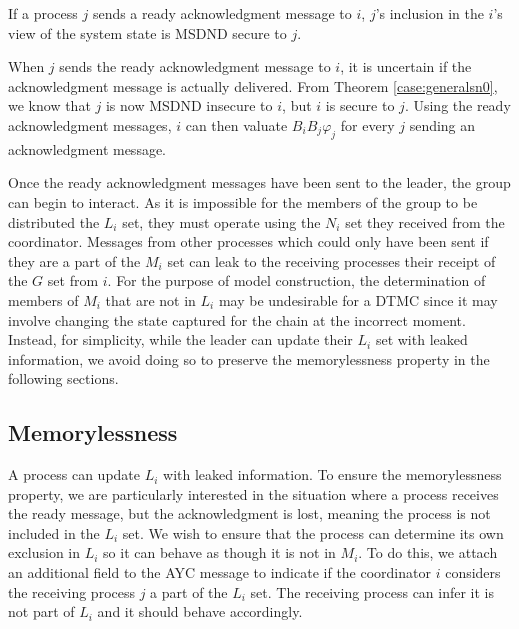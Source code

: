 \begin{thm}
    If a process $j$ sends a ready acknowledgment message to $i$, $j$'s inclusion in the $i$'s view of the system state is MSDND secure to $j$.
\end{thm}
\begin{prooftight}
When $j$ sends the ready acknowledgment message to $i$, it is uncertain if the acknowledgment message is actually delivered.
From Theorem \ref{case:generalsn0}, we know that $j$ is now MSDND insecure to $i$, but $i$ is secure to $j$.
Using the ready acknowledgment messages, $i$ can then valuate $B_i B_j \varphi_j$ for every $j$ sending an acknowledgment message.
\end{prooftight}

Once the ready acknowledgment messages have been sent to the leader, the group can begin to interact.
As it is impossible for the members of the group to be distributed the $L_i$ set, they must operate using the $N_i$ set they received from the coordinator.
Messages from other processes which could only have been sent if they are a part of the $M_i$ set can leak to the receiving processes their receipt of the $G$ set from $i$.
For the purpose of model construction, the determination of members of $M_i$ that are not in $L_i$ may be undesirable for a \ac{DTMC} since it may involve changing the state captured for the chain at the incorrect moment.
Instead, for simplicity, while the leader can update their $L_i$ set with leaked information, we avoid doing so to preserve the memorylessness property in the following sections.



\subsection{Memorylessness}

A process can update $L_i$ with leaked information.
To ensure the memorylessness property, we are particularly interested in the situation where a process receives the ready message, but the acknowledgment is lost, meaning the process is not included in the $L_i$ set.
We wish to ensure that the process can determine its own exclusion in $L_i$ so it can behave as though it is not in $M_i$.
To do this, we attach an additional field to the \ac{AYC} message to indicate if the coordinator $i$ considers the receiving process $j$ a part of the $L_i$ set.
The receiving process can infer it is not part of $L_i$ and it should behave accordingly.

